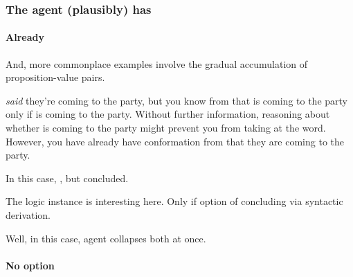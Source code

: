 \subsubsection{The agent (plausibly) has \zS{}}
\label{cha:zS:sec:question:illu:basic:has}

\paragraph{Already}

\begin{note}
  And, more commonplace examples involve the gradual accumulation of proposition-value pairs.

  \begin{illustration}
     \emph{said} they're coming to the party, but you know from  that  is coming to the party only if  is coming to the party.
    Without further information, reasoning about whether  is coming to the party might prevent you from taking  at the word.
    However, you have already have conformation from  that they are coming to the party.
  \end{illustration}
\end{note}

\begin{note}
  In this case, \requ{}, but concluded.
\end{note}

\begin{note}
  The logic instance is interesting here.
  Only if option of concluding via syntactic derivation.

  Well, in this case, agent collapses both at once.
\end{note}

\paragraph{No option}

